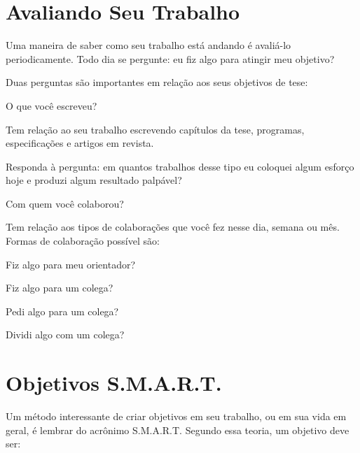 \section{Avaliando Seu Trabalho}


Uma maneira de saber como seu trabalho está andando é avaliá-lo periodicamente. Todo dia se pergunte: eu fiz algo para atingir meu objetivo?


Duas perguntas são importantes em relação aos seus objetivos de tese:

\begin{outline}
\1	O que você escreveu?


\2	Tem relação ao seu trabalho escrevendo capítulos da tese, programas, especificações e artigos em revista. 


\2	Responda à pergunta: em quantos trabalhos desse tipo eu coloquei algum esforço hoje e produzi algum resultado palpável?


\1	Com quem você colaborou?


\2	Tem relação aos tipos de colaborações que você fez nesse dia, semana ou mês. Formas de colaboração possível são:


\3	Fiz algo para meu orientador?


\3	Fiz algo para um colega?


\3	Pedi algo para um colega? 


\3	Dividi algo com um colega?
\end{outline}

\section{Objetivos S.M.A.R.T.}


Um método interessante de criar objetivos em seu trabalho, ou em sua vida em geral, é lembrar do acrônimo S.M.A.R.T. Segundo essa teoria, um objetivo deve ser:

